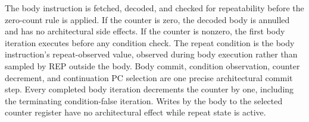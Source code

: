 The body instruction is fetched, decoded, and checked for repeatability before the zero-count rule is applied. If the counter is zero, the decoded body is annulled and has no architectural side effects. If the counter is nonzero, the first body iteration executes before any condition check. The repeat condition is the body instruction's repeat-observed value, observed during body execution rather than sampled by REP outside the body. Body commit, condition observation, counter decrement, and continuation PC selection are one precise architectural commit step. Every completed body iteration decrements the counter by one, including the terminating condition-false iteration. Writes by the body to the selected counter register have no architectural effect while repeat state is active.
